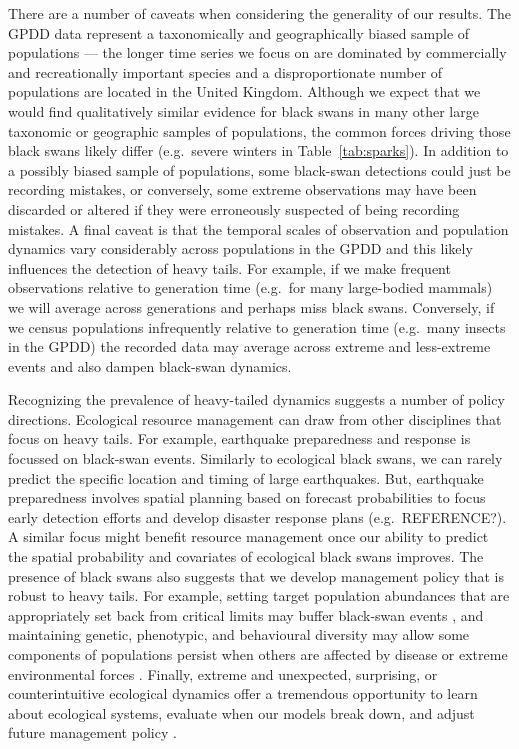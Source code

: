 There are a number of caveats when considering the generality of our results. The GPDD data represent a taxonomically and geographically biased sample of populations --- the longer time series we focus on are dominated by commercially and recreationally important species and a disproportionate number of populations are located in the United Kingdom. Although we expect that we would find qualitatively similar evidence for black swans in many other large taxonomic or geographic samples of populations, the common forces driving those black swans likely differ (e.g.~severe winters in Table~\ref{tab:sparks}). In addition to a possibly biased sample of populations, some black-swan detections could just be recording mistakes, or conversely, some extreme observations may have been discarded or altered if they were erroneously suspected of being recording mistakes. A final caveat is that the temporal scales of observation and population dynamics vary considerably across populations in the GPDD and this likely influences the detection of heavy tails. For example, if we make frequent observations relative to generation time (e.g.~for many large-bodied mammals) we will average across generations and perhaps miss black swans. Conversely, if we census populations infrequently relative to generation time (e.g.~many insects in the GPDD) the recorded data may average across extreme and less-extreme events and also dampen black-swan dynamics.

Recognizing the prevalence of heavy-tailed dynamics suggests a number of policy directions. Ecological resource management can draw from other disciplines that focus on heavy tails. For example, earthquake preparedness and response is focussed on black-swan events. Similarly to ecological black swans, we can rarely predict the specific location and timing of large earthquakes. But, earthquake preparedness involves spatial planning based on forecast probabilities to focus early detection efforts and develop disaster response plans (e.g.~REFERENCE?). A similar focus might benefit resource management once our ability to predict the spatial probability and covariates of ecological black swans improves. The presence of black swans also suggests that we develop management policy that is robust to heavy tails. For example, setting target population abundances that are appropriately set back from critical limits may buffer black-swan events \citep[e.g.][]{caddy1996}, and maintaining genetic, phenotypic, and behavioural diversity may allow some components of populations persist when others are affected by disease or extreme environmental forces \citep[e.g.][]{hilborn2003, schindler2010, anderson2014}. Finally, extreme and unexpected, surprising, or counterintuitive ecological dynamics offer a tremendous opportunity to learn about ecological systems, evaluate when our models break down, and adjust future management policy \citep{doak2008, pine-iii2009, lindenmayer2010}. 

